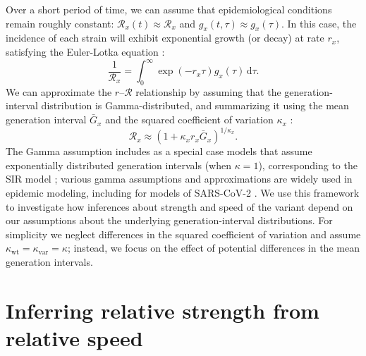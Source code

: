 \documentclass[12pt]{article}
\newcommand{\RR}{\ensuremath{{\mathcal R}}\xspace}
\newcommand{\dd}[1]{\ensuremath{\, \mathrm{d}#1}}
\newcommand{\dtau}{\dd{\tau}}
\begin{document}
Over a short period of time, we can assume that epidemiological conditions remain roughly constant: $\RR_x(t) \approx \RR_x$ and $g_x(t, \tau) \approx g_x(\tau)$.
In this case, the incidence of each strain will exhibit exponential growth (or decay) at rate $r_x$, satisfying the Euler-Lotka equation \citep{wallinga2007generation}:
\begin{equation}
\frac{1}{\RR_x} = \int_0^\infty \exp(- r_x \tau) g_x(\tau) \dtau.
\end{equation}
We can approximate the $r$--$\RR$ relationship by assuming that the generation-interval distribution is Gamma-distributed, and summarizing it using the mean generation interval $\bar{G}_x$ and the squared coefficient of variation $\kappa_x$ \citep{park2019practical}:
\begin{equation}
\RR_x \approx (1 + \kappa_x r_x \bar{G}_x)^{1/\kappa_x}.
\end{equation}
The Gamma assumption includes as a special case models that assume exponentially distributed generation intervals (when $\kappa=1$), corresponding to the SIR model \citep{anderson1991infectious}; various gamma assumptions and approximations are widely used in epidemic modeling, including for models of SARS-CoV-2 \citep{doi:10.1098/rsif.2020.0144}.
We use this framework to investigate how inferences about strength and speed of the variant depend on our assumptions about the underlying generation-interval distributions.
For simplicity we neglect differences in the squared coefficient of variation and assume $\kappa_{\mathrm{wt}} = \kappa_{\mathrm{var}} = \kappa$; instead, we focus on the effect of potential differences in the mean generation intervals.

\section{Inferring relative strength from relative speed}
\end{document}
